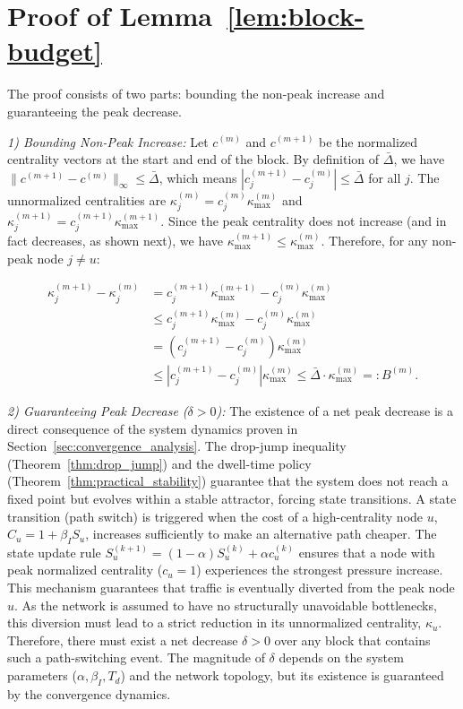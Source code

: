 \documentclass[journal]{IEEEtran}
\begin{document}

\section{Proof of Lemma~\ref{lem:block-budget}}
\label{app:proof_lem_block_budget}
\begin{IEEEproof}
The proof consists of two parts: bounding the non-peak increase and guaranteeing the peak decrease.

\noindent\textit{1) Bounding Non-Peak Increase:}
Let $c^{(m)}$ and $c^{(m+1)}$ be the normalized centrality vectors at the start and end of the block. By definition of $\bar\Delta$, we have $\|c^{(m+1)}-c^{(m)}\|_\infty \le \bar\Delta$, which means $|c^{(m+1)}_j - c^{(m)}_j| \le \bar\Delta$ for all $j$.
The unnormalized centralities are $\kappa^{(m)}_j = c^{(m)}_j \kappa^{(m)}_{\max}$ and $\kappa^{(m+1)}_j = c^{(m+1)}_j \kappa^{(m+1)}_{\max}$.
Since the peak centrality does not increase (and in fact decreases, as shown next), we have $\kappa^{(m+1)}_{\max} \le \kappa^{(m)}_{\max}$.
Therefore, for any non-peak node $j \neq u$:

\begin{align*}
\kappa^{(m+1)}_j - \kappa^{(m)}_j &= c^{(m+1)}_j \kappa^{(m+1)}_{\max} - c^{(m)}_j \kappa^{(m)}_{\max} \\
&\le c^{(m+1)}_j \kappa^{(m)}_{\max} - c^{(m)}_j \kappa^{(m)}_{\max} \\
&= (c^{(m+1)}_j - c^{(m)}_j) \kappa^{(m)}_{\max} \\
&\le |c^{(m+1)}_j - c^{(m)}_j| \kappa^{(m)}_{\max} \le \bar\Delta \cdot \kappa^{(m)}_{\max} =: B^{(m)}.
\end{align*}

\noindent\textit{2) Guaranteeing Peak Decrease ($\delta>0$):}
The existence of a net peak decrease is a direct consequence of the system dynamics proven in Section~\ref{sec:convergence_analysis}. The drop-jump inequality (Theorem~\ref{thm:drop_jump}) and the dwell-time policy (Theorem~\ref{thm:practical_stability}) guarantee that the system does not reach a fixed point but evolves within a stable attractor, forcing state transitions.
A state transition (path switch) is triggered when the cost of a high-centrality node $u$, $C_u = 1 + \beta_I S_u$, increases sufficiently to make an alternative path cheaper. The state update rule $S_u^{(k+1)} = (1-\alpha)S_u^{(k)} + \alpha c_u^{(k)}$ ensures that a node with peak normalized centrality ($c_u=1$) experiences the strongest pressure increase.
This mechanism guarantees that traffic is eventually diverted from the peak node $u$. As the network is assumed to have no structurally unavoidable bottlenecks, this diversion must lead to a strict reduction in its unnormalized centrality, $\kappa_u$. Therefore, there must exist a net decrease $\delta > 0$ over any block that contains such a path-switching event. The magnitude of $\delta$ depends on the system parameters ($\alpha, \beta_I, T_d$) and the network topology, but its existence is guaranteed by the convergence dynamics.
\end{IEEEproof}
\end{document}
